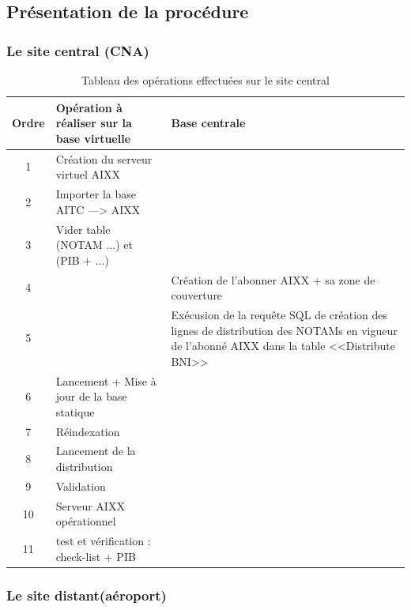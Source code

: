 \subsection{Présentation de la procédure}

\subsubsection{Le site central (CNA)}
\begin{table}[!h]
\begin{center}
\begin{tabularx}{17cm}{|c|p{7.5cm}|X|}
  \hline
  \textbf{Ordre}  & \textbf{Opération à réaliser sur la base virtuelle} & \textbf{Base centrale} \\ \hline
  1 & Création du serveur virtuel AIXX & \\ \hline
  2 & Importer la base AITC ---> AIXX & \\ \hline
  3 & Vider table (NOTAM ...) et (PIB + ...) & \\ \hline
  4 & & Création de l'abonner AIXX + sa zone de couverture \\ \hline
  5 & & Exécusion de la requête SQL de création des lignes de 	distribution des NOTAMs en vigueur de l'abonné AIXX dans la table <<Distribute BNI>> \\ \hline
  6 & Lancement + Mise à jour de la base statique & \\ \hline
  7 & Réindexation & \\ \hline
  8 & Lancement de la distribution & \\ \hline
  9 & Validation & \\ \hline
  10 & Serveur AIXX opérationnel & \\ \hline
  11 & test et vérification : check-list + PIB & \\ \hline

\end{tabularx}
\end{center}
\caption{Tableau des opérations effectuées sur le site central}
\end{table}
\subsubsection{Le site distant(aéroport)}

